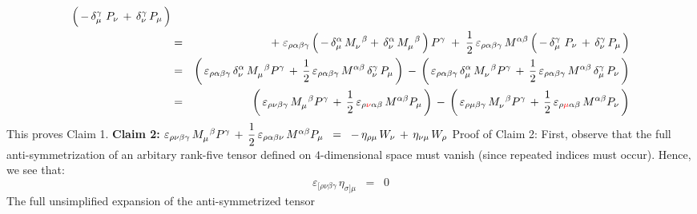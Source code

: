 \begin{enumerate}
\begin{eqnarray*}
		\left(\,
			\overset{{\color{white}.}}{-}\,
			\delta^{\gamma}_{\mu}\,\,P_{\nu}
			\,+\,
			\delta^{\gamma}_{\nu}\,P_{\mu}
			\,\right)
	\\
	& = &
		{\color{black}+}\;
		\varepsilon_{\rho\alpha\beta\gamma}
		\left(\,
			\overset{{\color{white}.}}{-}\,
			\delta^{\alpha}_{\mu}\,M_{\nu}^{{\color{white}\nu}\beta}
			+\,\delta^{\alpha}_{\nu}\,M_{\mu}^{{\color{white}\mu}\beta}
			\,\right)
		P^{\gamma}
		\;+\;
		\dfrac{1}{2}\,\varepsilon_{\rho\alpha\beta\gamma}\,M^{\alpha\beta}
		\left(\,
			\overset{{\color{white}.}}{-}\,
			\delta^{\gamma}_{\mu}\,\,P_{\nu}
			\,+\,
			\delta^{\gamma}_{\nu}\,P_{\mu}
			\,\right)
	\\
	& = &
		\left(\,
			\varepsilon_{\rho\alpha\beta\gamma}\,
			\delta^{\alpha}_{\nu}\,M_{\mu}^{{\color{white}\mu}\beta}P^{\gamma}
			\,+\,
			\dfrac{1}{2}\,\varepsilon_{\rho\alpha\beta\gamma}\,
			M^{\alpha\beta}\,\delta^{\gamma}_{\nu}\,P_{\mu}
			\,\right)
		\,-\,
		\left(\,
			\varepsilon_{\rho\alpha\beta\gamma}\,
			\delta^{\alpha}_{\mu}\,M_{\nu}^{{\color{white}\nu}\beta}P^{\gamma}
			\,+\,
			\dfrac{1}{2}\,\varepsilon_{\rho\alpha\beta\gamma}\,
			M^{\alpha\beta}\,\delta^{\gamma}_{\mu}\,P_{\nu}
			\,\right)
	\\
	& = &
		\left(\,
			\varepsilon_{\rho\nu\beta\gamma}\,
			M_{\mu}^{{\color{white}\mu}\beta}P^{\gamma}
			\,+\,
			\dfrac{1}{2}\,\varepsilon_{\rho{\color{red}\nu}\alpha\beta}\,
			M^{\alpha\beta}P_{\mu}
			\,\right)
		\,-\,
		\left(\,
			\varepsilon_{\rho\mu\beta\gamma}\,
			M_{\nu}^{{\color{white}\nu}\beta}P^{\gamma}
			\,+\,
			\dfrac{1}{2}\,\varepsilon_{\rho{\color{red}\mu}\alpha\beta}\,
			M^{\alpha\beta}P_{\nu}
			\,\right)
	\end{eqnarray*}
	This proves Claim 1.
	\vskip 0.3cm
	\textbf{Claim 2:}\quad
	$
	\varepsilon_{\rho\nu\beta\gamma}\,
	M_{\mu}^{{\color{white}\mu}\beta}P^{\gamma}
	\,+\,
	\dfrac{1}{2}\,\varepsilon_{\rho\alpha\beta\nu}\,
	M^{\alpha\beta}P_{\mu}
	\;\; = \;\;
	    -\,\eta_{\rho\mu}\,W_{\nu} \,+\, \eta_{\nu\mu}\,W_{\rho}
	$
	\vskip 0.1cm
	\noindent
	Proof of Claim 2:\;\;
	First, observe that the full anti-symmetrization of an arbitary rank-five tensor
	defined on $4$-dimensional space must vanish (since repeated indices must occur).
	Hence, we see that:
    \begin{equation*}
    \varepsilon_{[\rho\nu\beta\gamma}\,\eta_{\sigma]\mu}
    \;\; = \;\;
    	0
    \end{equation*}
    The full unsimplified expansion of the anti-symmetrized tensor

\end{enumerate}
